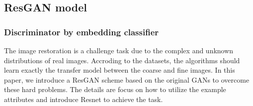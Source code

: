 \documentclass[publish,JACIII,paper]{jaciiiarticle}
\begin{document}
\subsection{ResGAN model}
\subsubsection{Discriminator by embedding classifier}
The image restoration is a challenge task due to the complex and unknown distributions of real images.
Accroding to the datasets, the algorithms should learn exactly the transfer model between the coarse and fine images.      
In this paper, we introduce a ResGAN scheme based on the original GANs to overcome these hard problems.
The details are focus on how to utilize the example attributes and introduce Resnet to achieve the task.
\end{document}
